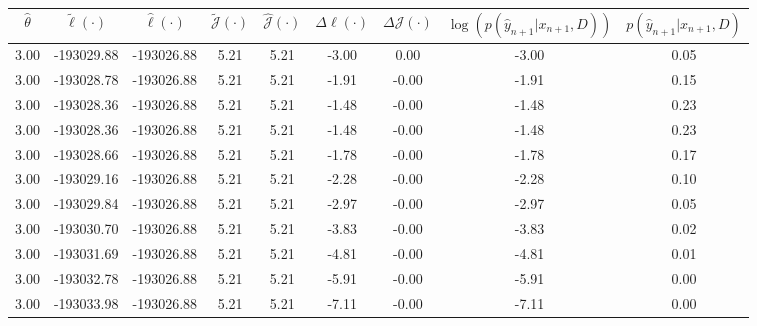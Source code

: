 \begin{table}[htbp]
        \centering
        \tiny
        \begin{adjustbox}{angle=90}
            \begin{tabular}{|c|c|c|c|c|c|c|c|c|}
                \hline
                 $\hat{\theta}$ & $\tilde{\ell}(\cdot)$ & $\hat{\ell}(\cdot)$ & $\tilde{\mathcal{J}}(\cdot)$ & $\hat{\mathcal{J}}(\cdot)$ & $\Delta \ell(\cdot)$ & $\Delta \mathcal{J}(\cdot)$ & $\log(p(\hat{y}_{n+1}|x_{n+1}, D))$ & $p(\hat{y}_{n+1}|x_{n+1}, D)$ \\
                \hline
                 3.00 & -193029.88 & -193026.88 & 5.21 & 5.21 & -3.00 & 0.00 & -3.00 & 0.05\\ \hline
 3.00 & -193028.78 & -193026.88 & 5.21 & 5.21 & -1.91 & -0.00 & -1.91 & 0.15\\ \hline
 3.00 & -193028.36 & -193026.88 & 5.21 & 5.21 & -1.48 & -0.00 & -1.48 & 0.23\\ \hline
 3.00 & -193028.36 & -193026.88 & 5.21 & 5.21 & -1.48 & -0.00 & -1.48 & 0.23\\ \hline
 3.00 & -193028.66 & -193026.88 & 5.21 & 5.21 & -1.78 & -0.00 & -1.78 & 0.17\\ \hline
 3.00 & -193029.16 & -193026.88 & 5.21 & 5.21 & -2.28 & -0.00 & -2.28 & 0.10\\ \hline
 3.00 & -193029.84 & -193026.88 & 5.21 & 5.21 & -2.97 & -0.00 & -2.97 & 0.05\\ \hline
 3.00 & -193030.70 & -193026.88 & 5.21 & 5.21 & -3.83 & -0.00 & -3.83 & 0.02\\ \hline
 3.00 & -193031.69 & -193026.88 & 5.21 & 5.21 & -4.81 & -0.00 & -4.81 & 0.01\\ \hline
 3.00 & -193032.78 & -193026.88 & 5.21 & 5.21 & -5.91 & -0.00 & -5.91 & 0.00\\ \hline
 3.00 & -193033.98 & -193026.88 & 5.21 & 5.21 & -7.11 & -0.00 & -7.11 & 0.00\\ \hline
            \end{tabular}
        \end{adjustbox}
        \caption{}
        \label{}
    \end{table}
    